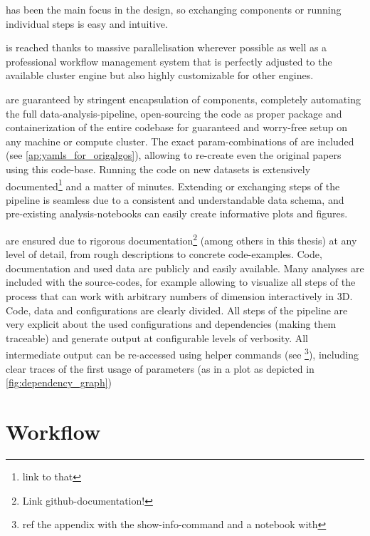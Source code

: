 \begin{description}[style=unboxed]
	\item[Modularity] has been the main focus in the design, so exchanging components or running individual steps is easy and intuitive.
	\item[Scalability] is reached thanks to massive parallelisation wherever possible as well as a professional workflow management system that is perfectly adjusted to the available cluster engine but also highly customizable for other engines.
	\item[Reproducibility and Adaptability] are guaranteed by stringent encapsulation of components, completely automating the full data-analysis-pipeline, open-sourcing the code as proper package and containerization of the entire codebase for guaranteed and worry-free setup on any machine or compute cluster. The exact \gls{param}-combinations of \mainalgos are included (see \autoref{ap:yamls_for_origalgos}), allowing to re-create even the original papers using this code-base. Running the code on new datasets is extensively documented\footnote{ link to that} and a matter of minutes. Extending or exchanging steps of the pipeline is seamless due to a consistent and understandable data schema, and pre-existing analysis-notebooks can easily create informative plots and figures.
	\item[Transparency and Understandability] are ensured due to rigorous documentation\footnote{ Link github-documentation!} (among others in this thesis) at any level of detail, from rough descriptions to concrete code-examples. Code, documentation and used data are publicly and easily available. Many analyses are included with the source-codes, for example allowing to visualize all steps of the process that can work with arbitrary numbers of dimension interactively in 3D. Code, data and configurations are clearly divided. All steps of the pipeline are very explicit about the used configurations and dependencies (making them traceable) and generate output at configurable levels of verbosity. All intermediate output can be re-accessed using helper commands (see \footnote{ ref the appendix with the show-info-command and a notebook with }), including clear traces of the first usage of parameters (as \eg in a plot as depicted in \autoref{fig:dependency_graph})
\end{description}



\section{Workflow}
\label{sec:workflow}


